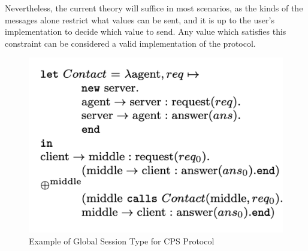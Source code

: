 \documentclass[12pt,twoside]{report}
\newcommand{\comment}[1]{}
\begin{document}
Nevertheless, the current theory will suffice in most scenarios, as the kinds of the messages alone restrict what values can be sent, and it is up to the user's implementation to decide which value to send. Any value which satisfies this constraint can be considered a valid implementation of the protocol.
\begin{figure}[h]
    \centering
    \includegraphics[scale=0.5]{nested_session_example.png}
    \caption{Example of Global Session Type for CPS Protocol\cite{nestedprotocols}\comment{nested protocols snippet}}
    \label{nested_session_example}
\end{figure}{}
\end{document}
